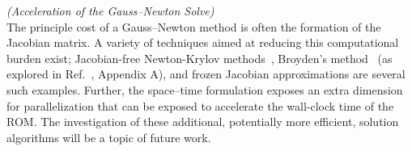 \begin{remark}\label{remark:gaussnewton}\textit{(Acceleration of the Gauss--Newton Solve)}\\
The principle cost of a Gauss--Newton method is often the formation of the Jacobian matrix. A variety of techniques aimed at 
reducing this computational burden exist; Jacobian-free Newton-Krylov methods~\cite{jfnk}, Broyden's method~\cite{broyden} (as explored in Ref.~\cite{carlberg_thesis}, Appendix A), and frozen Jacobian approximations are several such examples. Further, the space--time formulation exposes an extra dimension for parallelization that can be exposed to accelerate the wall-clock time of the ROM. The investigation of these additional, potentially more efficient, solution algorithms will be a topic of future work. 
\end{remark}
